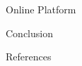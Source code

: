 \documentclass[final,a0,portrait]{beamer}
\newlength{\onecolwid}
\begin{document}
\begin{frame}[t]
\begin{columns}[t]
\begin{column}{\onecolwid}
\begin{block}{Online Platform}
\end{block}



\begin{block}{Conclusion}
{\small


}
\end{block}


\begin{block}{References}

\nocite{*} %
\footnotesize{
\vspace{0.75in}}


\end{block}




\end{column} %

\end{columns} %

\end{frame} %
\end{document}
